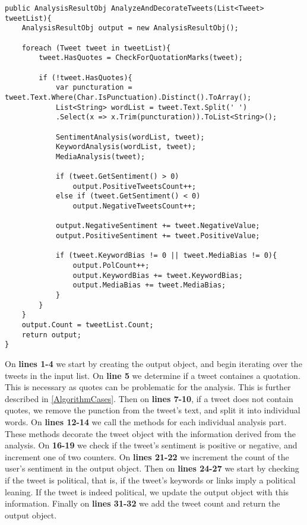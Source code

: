 \begin{minipage}[H]{\linewidth}
\begin{lstlisting}[caption = Main method for handling the algorithm, label = AlgorithmStructure]
public AnalysisResultObj AnalyzeAndDecorateTweets(List<Tweet> tweetList){
	AnalysisResultObj output = new AnalysisResultObj();

	foreach (Tweet tweet in tweetList){
    	tweet.HasQuotes = CheckForQuotationMarks(tweet);

		if (!tweet.HasQuotes){
        	var puncturation = tweet.Text.Where(Char.IsPunctuation).Distinct().ToArray(); 
        	List<String> wordList = tweet.Text.Split(' ')
        	.Select(x => x.Trim(puncturation)).ToList<String>();

            SentimentAnalysis(wordList, tweet);
            KeywordAnalysis(wordList, tweet);
            MediaAnalysis(tweet);

            if (tweet.GetSentiment() > 0)
            	output.PositiveTweetsCount++;
            else if (tweet.GetSentiment() < 0)
            	output.NegativeTweetsCount++;

            output.NegativeSentiment += tweet.NegativeValue;
            output.PositiveSentiment += tweet.PositiveValue;

            if (tweet.KeywordBias != 0 || tweet.MediaBias != 0){
            	output.PolCount++;
                output.KeywordBias += tweet.KeywordBias;
                output.MediaBias += tweet.MediaBias;    
            }
		}
	}
    output.Count = tweetList.Count;
    return output;
}
\end{lstlisting}
\end{minipage}

On \textbf{lines 1-4} we start by creating the output object, and begin
iterating over the tweets in the input list. On \textbf{line 5} we
determine if a tweet containes a quotation. This is necessary as quotes can be
problematic for the analysis. This is further described in
\autoref{AlgorithmCases}. Then on \textbf{lines 7-10}, if a tweet does not
contain quotes, we remove the punction from the tweet's text, and split it into
individual words. On \textbf{lines 12-14} we call the methods for each
individual analysis part. These methods decorate the tweet object with the
information derived from the analysis. On \textbf{16-19} we check if the tweet's
sentiment is positive or negative, and increment one of two counters. On
\textbf{lines 21-22} we increment the count of the user's sentiment in the
output object. Then on \textbf{lines 24-27} we start by checking if the tweet is
political, that is, if the tweet's keywords or links imply a political leaning.
If the tweet is indeed political, we update the output object with this
information. Finally on \textbf{lines 31-32} we add
the tweet count and return the output object.

